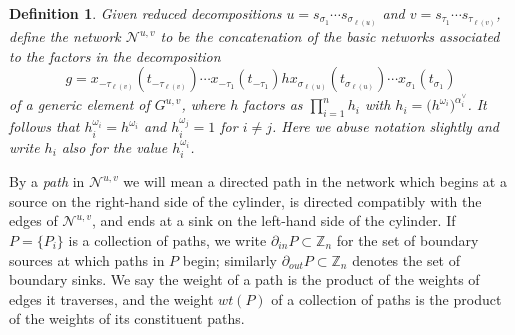 \documentclass[12pt]{amsart}
\newcommand{\ZZ}{\mathbb{Z}}
\newcommand{\cN}{\mathcal{N}} %
\newtheorem{definition}[theorem]{Definition}
\theoremstyle{remark}
\numberwithin{equation}{section}
\begin{document}
\begin{definition}
Given reduced decompositions $u=s_{\sigma_1}\cdots s_{\sigma_{\ell(u)}}$ and $v=s_{\tau_1}\cdots s_{\tau_{\ell(v)}}$, define the network $\cN^{u,v}$ to be the concatenation of the basic networks associated to the factors in the decomposition 
\begin{equation}\label{eq:double Bruhat generic element}
  g=x_{-\tau_{\ell(v)}}(t_{-\tau_{\ell(v)}})\cdots x_{-\tau_1}(t_{-\tau_1}) hx_{\sigma_{\ell(u)}}(t_{\sigma_{\ell(u)}}) \cdots x_{\sigma_1}(t_{\sigma_1})
\end{equation}
of a generic element of $G^{u,v}$, where $h$ factors as $\prod\limits_{i=1}^n h_i$ with $h_i=\big(h^{\omega_i}\big)^{\alpha_i^\vee}$.
It follows that $h_i^{\omega_i}=h^{\omega_i}$ and $h_i^{\omega_j}=1$ for $i\ne j$.  
Here we abuse notation slightly and write $h_i$ also for the value $h_i^{\omega_i}$.
\end{definition}

By a \emph{path} in $\cN^{u,v}$ we will mean a directed path in the network which begins at a source on the right-hand side of the cylinder, is directed compatibly with the edges of $\cN^{u,v}$, and ends at a sink on the left-hand side of the cylinder. 
If $P = \{P_i\}$ is a collection of paths, we write $\partial_{in}P \subset \ZZ_n$ for the set of boundary sources at which paths in $P$ begin; similarly $\partial_{out}P \subset \ZZ_n$ denotes the set of boundary sinks. 
We say the weight of a path is the product of the weights of edges it traverses, and the weight $wt(P)$ of a collection of paths is the product of the weights of its constituent paths.
\end{document}
